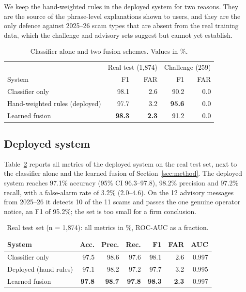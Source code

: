 \documentclass[conference]{IEEEtran}
\begin{document}
We keep the hand-weighted rules in the deployed system for two reasons. They are the source of the phrase-level explanations shown to users, and they are the only defence against 2025--26 scam types that are absent from the real training data, which the challenge and advisory sets suggest but cannot yet establish.

\begin{table}[t]
\centering
\caption{Classifier alone and two fusion schemes. Values in \%.}
\label{tab:fusion}
\footnotesize
\begin{tabular}{@{}lrrrr@{}}
\toprule
 & \multicolumn{2}{c}{Real test (1,874)} & \multicolumn{2}{c}{Challenge (259)} \\
System & F1 & FAR & F1 & FAR \\
\midrule
Classifier only & 98.1 & 2.6 & 90.2 & 0.0 \\
Hand-weighted rules (deployed) & 97.7 & 3.2 & \textbf{95.6} & 0.0 \\
Learned fusion & \textbf{98.3} & \textbf{2.3} & 91.2 & 0.0 \\
\bottomrule
\end{tabular}
\end{table}

\subsection{Deployed system}
Table~\ref{tab:final} reports all metrics of the deployed system on the real test set, next to the classifier alone and the learned fusion of Section~\ref{sec:method}. The deployed system reaches 97.1\% accuracy (95\% CI 96.3--97.8), 98.2\% precision and 97.2\% recall, with a false-alarm rate of 3.2\% (2.0--4.6). On the 12 advisory messages from 2025--26 it detects 10 of the 11 scams and passes the one genuine operator notice, an F1 of 95.2\%; the set is too small for a firm conclusion.

\begin{table}[t]
\centering
\caption{Real test set (n = 1,874): all metrics in \%, ROC-AUC as a fraction.}
\label{tab:final}
\footnotesize
\setlength{\tabcolsep}{4pt}
\begin{tabular}{@{}lrrrrrr@{}}
\toprule
System & Acc. & Prec. & Rec. & F1 & FAR & AUC \\
\midrule
Classifier only & 97.5 & 98.6 & 97.6 & 98.1 & 2.6 & 0.997 \\
Deployed (hand rules) & 97.1 & 98.2 & 97.2 & 97.7 & 3.2 & 0.995 \\
Learned fusion & \textbf{97.8} & \textbf{98.7} & \textbf{97.8} & \textbf{98.3} & \textbf{2.3} & 0.997 \\
\bottomrule
\end{tabular}
\end{table}
\end{document}
